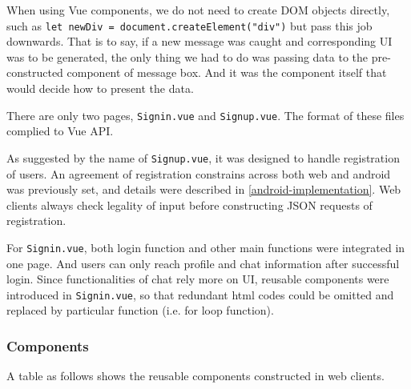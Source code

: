 When using Vue components, we do not need to create DOM objects directly, such as \texttt{let newDiv = document.createElement("div")} but pass this job downwards. That is to say, if a new message was caught and corresponding UI was to be generated, the only thing we had to do was passing data to the pre-constructed component of message box. And it was the component itself that would decide how to present the data.

There are only two pages, \texttt{Signin.vue} and \texttt{Signup.vue}. The format of these files complied to Vue API.

As suggested by the name of \texttt{Signup.vue}, it was designed to handle registration of users. An agreement of registration constrains across both web and android was previously set, and details were described in \ref{android-implementation}. Web clients always check legality of input before constructing JSON requests of registration.

For \texttt{Signin.vue}, both login function and other main functions were integrated in one page. And users can only reach profile and chat information after successful login. Since functionalities of chat rely more on UI, reusable components were introduced in \texttt{Signin.vue}, so that redundant html codes could be omitted and replaced by particular function (i.e. for loop function).

\subsubsection{Components}

A table as follows shows the reusable components constructed in web clients.

